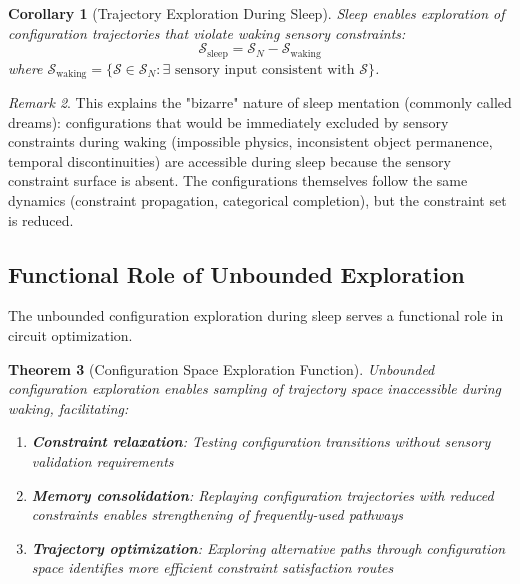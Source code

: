 \documentclass[aps,prd,twocolumn,superscriptaddress,floatfix,nofootinbib]{revtex4-2}
\newtheorem{theorem}{Theorem}[section]
\newtheorem{corollary}[theorem]{Corollary}
\theoremstyle{remark}
\newtheorem{remark}[theorem]{Remark}
\begin{document}
\begin{corollary}[Trajectory Exploration During Sleep]
\label{cor:bizarreness}
Sleep enables exploration of configuration trajectories that violate waking sensory constraints:
\begin{equation}
\mathcal{S}_{\text{sleep}} = \mathcal{S}_N - \mathcal{S}_{\text{waking}}
\end{equation}
where $\mathcal{S}_{\text{waking}} = \{\mathcal{S} \in \mathcal{S}_N : \exists \text{ sensory input consistent with } \mathcal{S}\}$.
\end{corollary}

\begin{remark}
This explains the "bizarre" nature of sleep mentation (commonly called dreams): configurations that would be immediately excluded by sensory constraints during waking (impossible physics, inconsistent object permanence, temporal discontinuities) are accessible during sleep because the sensory constraint surface is absent. The configurations themselves follow the same dynamics (constraint propagation, categorical completion), but the constraint set is reduced.
\end{remark}

\subsection{Functional Role of Unbounded Exploration}

The unbounded configuration exploration during sleep serves a functional role in circuit optimization.

\begin{theorem}[Configuration Space Exploration Function]
\label{thm:dream_function}
Unbounded configuration exploration enables sampling of trajectory space inaccessible during waking, facilitating:
\begin{enumerate}
\item \textbf{Constraint relaxation}: Testing configuration transitions without sensory validation requirements
\item \textbf{Memory consolidation}: Replaying configuration trajectories with reduced constraints enables strengthening of frequently-used pathways~\cite{walker2009overnight}
\item \textbf{Trajectory optimization}: Exploring alternative paths through configuration space identifies more efficient constraint satisfaction routes
\end{enumerate}
\end{theorem}
\end{document}
